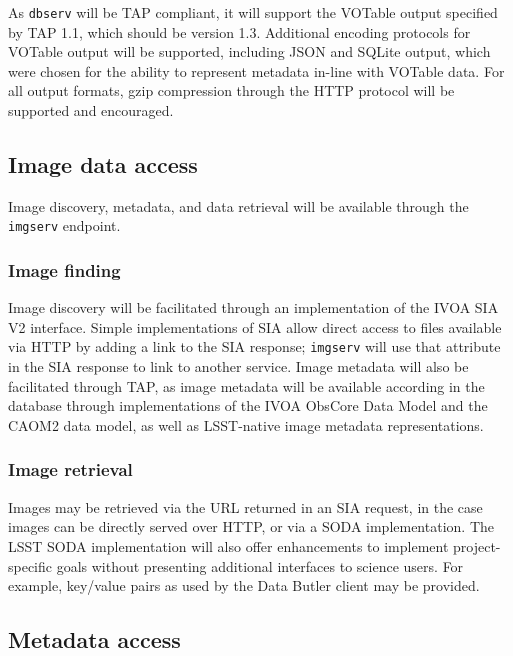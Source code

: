 As \texttt{dbserv} will be TAP compliant, it will support the VOTable output
specified by TAP 1.1, which should be version 1.3. Additional encoding
protocols for VOTable output will be supported, including JSON and SQLite
output, which were chosen for the ability to represent metadata in-line with
VOTable data. For all output formats, gzip compression through the HTTP
protocol will be supported and encouraged.

\subsection{Image data access}\label{image-data-access}

Image discovery, metadata, and data retrieval will be available through
the \texttt{imgserv} endpoint.

\subsubsection{Image finding}\label{image-finding}

Image discovery will be facilitated through an implementation of the IVOA SIA
V2 interface. Simple implementations of SIA allow direct access to files
available via HTTP by adding a link to the SIA response; \texttt{imgserv} will
use that attribute in the SIA response to link to another service. Image
metadata will also be facilitated through TAP, as image metadata will be
available according in the database through implementations of the IVOA ObsCore
Data Model \citep{2011ivoa.spec.1028T} and the CAOM2 data model, as well as LSST-native
image metadata representations.

\subsubsection{Image retrieval}\label{image-retrieval}

Images may be retrieved via the URL returned in an SIA request, in the case
images can be directly served over HTTP, or via a SODA implementation. The LSST
SODA implementation will also offer enhancements to implement project-specific
goals without presenting additional interfaces to science users. For example,
key/value pairs as used by the Data Butler client may be provided.

\subsection{Metadata access}\label{metadata-access}


